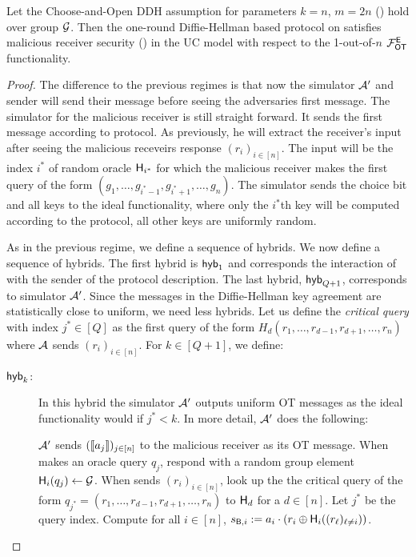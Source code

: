\begin{lemma}
	Let the Choose-and-Open DDH assumption for parameters $k=n$, $m=2n$ () hold over group $\mathcal{G}$. Then the one-round Diffie-Hellman based protocol  on  satisfies malicious receiver security () in the UC model with respect to the 1-out-of-$n$ $\mathcal{F}_{\mathsf{OT}}^\mathsf{E}$ functionality.
\end{lemma}
\begin{proof}
The difference to the previous regimes is that now the simulator $\mathcal{A}'$ and sender will send their message before seeing the adversaries first message. The simulator for the malicious receiver is still straight forward. It sends the first message according to protocol. As previously, he will extract the receiver's input after seeing the malicious receveirs response $(r_i)_{i\in [n]}$. The input will be the index $i^*$ of random oracle $\mathsf{H}_{i^*}$ for which the malicious receiver makes the first query of the form $(g_1,\ldots,g_{i^*-1},g_{i^*+1},\ldots,g_n)$. The simulator sends the choice bit and all keys to the ideal functionality, where only the $i^*$th key will be computed according to the protocol, all other keys are uniformly random. 

As in the previous regime, we define a sequence of hybrids. We now define a sequence of hybrids. The first hybrid is $\mathsf{hyb}_1$ and corresponds the interaction of \Adv with the sender of the protocol description. The last hybrid, $\mathsf{hyb}_{Q+1}$, corresponds to simulator $\mathcal{A}'$. Since the messages in the Diffie-Hellman key agreement are statistically close to uniform, we need less hybrids. Let us define the \emph{critical query} with index $j^*\in[Q]$ as the first query of the form $H_d(r_1,\dots, r_{d-1},r_{d+1},\dots, r_{n})$ where $\mathcal{A}$ sends $(r_i)_{i\in[n]}$. 
For $k\in[Q+1]$, we define:
\begin{description}
\item[$\mathsf{hyb}_{k}$:] In this hybrid the simulator $\mathcal{A}'$ outputs uniform OT messages as the ideal functionality would if $j^*<k$. In more detail,  $\mathcal{A}'$ does the following:

$\mathcal{A}'$ sends $(\llbracket a_j\rrbracket)_{j\in [n]}$ to the malicious receiver as its OT message.
 When \Adv makes an oracle query $q_{j}$, respond with a random group element $\mathsf{H}_i(q_{j})\leftarrow\mathcal{G}$. When \Adv sends $(r_i)_{i\in[n]}$, look up the the critical query of the form $q_{j^*}= (r_1,\dots, r_{d-1},r_{d+1},\dots, r_{n})$ to $\mathsf{H}_d$ for a $d\in[n]$. Let $j^*$ be the query index. Compute for all $i\in[n]$, $s_{\mathsf{B},i}:=a_i\cdot(r_i\oplus\mathsf{H}_i((r_\ell)_{\ell\neq i}))$. 


\end{description}
\end{proof}
